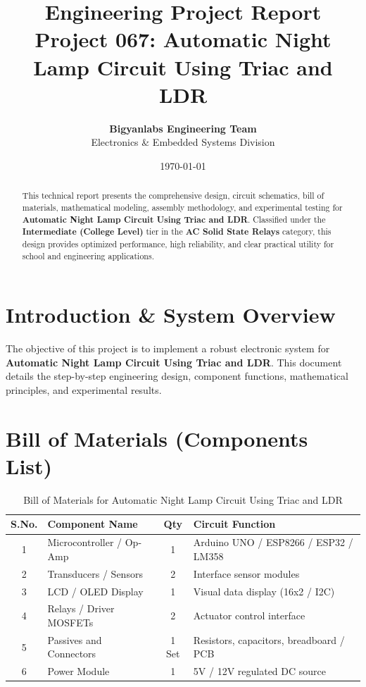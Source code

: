 \documentclass[11pt,a4paper]{article}
\title{\textbf{\Huge Engineering Project Report}\\[0.5em] \Large Project 067: Automatic Night Lamp Circuit Using Triac and LDR}
\author{\textbf{Bigyanlabs Engineering Team}\\ Electronics \& Embedded Systems Division}
\date{\today}
\begin{document}
\maketitle
\thispagestyle{empty}

\begin{abstract}
This technical report presents the comprehensive design, circuit schematics, bill of materials, mathematical modeling, assembly methodology, and experimental testing for \textbf{Automatic Night Lamp Circuit Using Triac and LDR}. Classified under the \textbf{Intermediate (College Level)} tier in the \textbf{AC Solid State Relays} category, this design provides optimized performance, high reliability, and clear practical utility for school and engineering applications.
\end{abstract}

\newpage
\tableofcontents
\newpage

\section{Introduction \& System Overview}
The objective of this project is to implement a robust electronic system for \textbf{Automatic Night Lamp Circuit Using Triac and LDR}. This document details the step-by-step engineering design, component functions, mathematical principles, and experimental results.

\section{Bill of Materials (Components List)}
\begin{table}[h!]
\centering
\caption{Bill of Materials for Automatic Night Lamp Circuit Using Triac and LDR}
\vspace{0.5em}
\begin{tabular}{clcp{7cm}}
\toprule
\textbf{S.No.} & \textbf{Component Name} & \textbf{Qty} & \textbf{Circuit Function} \\
\midrule
1 & Microcontroller / Op-Amp & 1 & Arduino UNO / ESP8266 / ESP32 / LM358 \\
2 & Transducers / Sensors & 2 & Interface sensor modules \\
3 & LCD / OLED Display & 1 & Visual data display (16x2 / I2C) \\
4 & Relays / Driver MOSFETs & 2 & Actuator control interface \\
5 & Passives and Connectors & 1 Set & Resistors, capacitors, breadboard / PCB \\
6 & Power Module & 1 & 5V / 12V regulated DC source \\
\bottomrule
\end{tabular}
\end{table}
\end{document}
